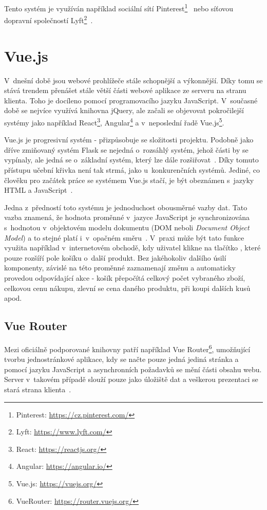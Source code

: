 Tento systém je využíván například sociální sítí Pinterest\footnote{Pinterest: \url{https://cz.pinterest.com/}}~\cite{bib:flask-pinterest}
nebo síťovou dopravní společností Lyft\footnote{Lyft: \url{https://www.lyft.com/}}~\cite{bib:flask-lyft}.



\section{Vue.js}\label{section:Vue.js}
V~dnešní době jsou webové prohlížeče stále schopnější a výkonnější. Díky tomu se stává trendem přenášet stále větší části webové aplikace ze serveru na stranu klienta. Toho je docíleno pomocí programovacího jazyku JavaScript. V~současné době se nejvíce využívá knihovna jQuery, %
ale začali se objevovat pokročilejší systémy jako například React\footnote{React: \url{https://reactjs.org/}}, Angular\footnote{Angular: \url{https://angular.io/}} a v~neposlední řadě Vue.js\footnote{Vue.js: \url{https://vuejs.org/}}.

Vue.js je progresivní systém - přizpůsobuje se složitosti projektu. Podobně jako dříve zmiňovaný systém Flask se nejedná o~rozsáhlý systém, jehož části by se vypínaly, ale jedná se o~základní systém, který lze dále rozšiřovat~\cite{bib:vue-progressive}.
Díky tomuto přístupu učební křivka není tak strmá, jako u~konkurenčních systémů. Jediné, co člověku pro začátek práce se systémem Vue.js stačí, je být obeznámen s~jazyky HTML a JavaScript~\cite{bib:vue-curve}.

Jedna z~předností toto systému je jednoduchost obousměrné vazby dat. Tato vazba znamená, že hodnota proměnné v~jazyce JavaScript je synchronizována s~hodnotou v~objektovém modelu dokumentu (DOM neboli \emph{Document Object Model}) a to stejné platí i~v~opačném směru~\cite{bib:vue-binding}.
V~praxi může být tato funkce využita například v~internetovém obchodě, kdy uživatel klikne na tlačítko , které pouze rozšíří pole košíku o~další produkt. Bez jakéhokoliv dalšího úsilí komponenty, závislé na této proměnné zaznamenají změnu a automaticky provedou odpovídající akce - košík přepočítá celkový počet vybraného zboží, celkovou cenu nákupu, zlevní se cena daného produktu, při koupi dalších kusů apod. 


\subsection{Vue Router}
Mezi oficiálně podporované knihovny patří například Vue Router\footnote{VueRouter: \url{https://router.vuejs.org/}}, umožňující tvorbu jednostránkové aplikace, kdy se načte pouze jedná jediná stránka a pomocí jazyku JavaScript a asynchronních požadavků se mění části obsahu webu. Server v~takovém případě slouží pouze jako úložiště dat a veškerou prezentaci se stará strana klienta~\cite{bib:vue-router}. %


